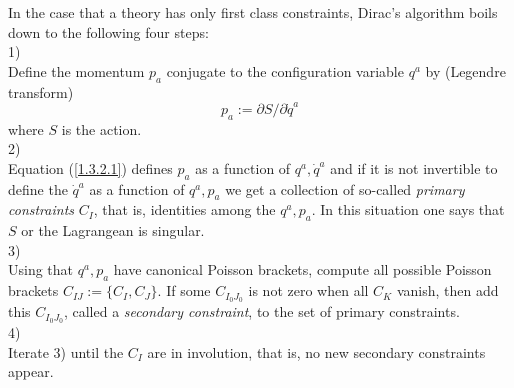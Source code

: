 \documentclass[12pt]{report}
\def\be{\begin{equation}}
\def\ee{\end{equation}}
\begin{document}
In the case that a theory has only first class constraints, Dirac's
algorithm \cite{17} boils down to the following four steps:\\
1)\\
Define the momentum $p_a$ conjugate to the configuration variable 
$q^a$ by (Legendre transform)
\be \label{1.3.2.1}
p_a:=\partial S/\partial\dot{q}^a
\ee
where $S$ is the action.\\
2)\\
Equation (\ref{1.3.2.1}) defines $p_a$ as a function of $q^a,\dot{q}^a$
and if it is not invertible to define the $\dot{q}^a$ as a function
of $q^a,p_a$ we get a collection of so-called {\it primary constraints}
$C_I$, that is, identities among the $q^a,p_a$. In this situation one says
that $S$ or the Lagrangean is singular. 
\\
3)\\
Using that $q^a,p_a$ have canonical Poisson brackets,
compute all possible Poisson brackets $C_{IJ}:=\{C_I,C_J\}$. If 
some $C_{I_0 J_0}$ is not zero when all $C_K$ vanish, 
then add this $C_{I_0 J_0}$, called a {\it secondary constraint}, to
the set of primary constraints.\\
4)\\
Iterate 3) until the $C_I$ are in involution, that is, no new secondary
constraints appear.\\
\end{document}
